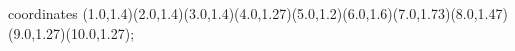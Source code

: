 					coordinates { (1.0,1.4)(2.0,1.4)(3.0,1.4)(4.0,1.27)(5.0,1.2)(6.0,1.6)(7.0,1.73)(8.0,1.47)(9.0,1.27)(10.0,1.27)};